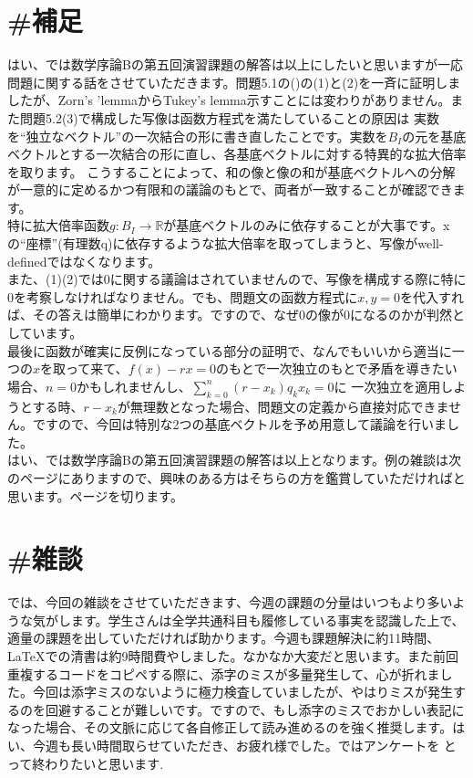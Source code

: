 \documentclass{jreport}
\begin{document}
\section{\#補足}
はい、では数学序論Bの第五回演習課題の解答は以上にしたいと思いますが一応問題に関する話をさせていただきます。問題5.1の()の(1)と(2)を一斉に証明しましたが、Zorn's 'lemmaからTukey's lemma示すことには変わりがありません。また問題5.2(3)で構成した写像は函数方程式を満たしていることの原因は
実数を“独立なベクトル”の一次結合の形に書き直したことです。実数を$B_I$の元を基底ベクトルとする一次結合の形に直し、各基底ベクトルに対する特異的な拡大倍率を取ります。
こうすることによって、和の像と像の和が基底ベクトルへの分解が一意的に定めるかつ有限和の議論のもとで、両者が一致することが確認できます。\\
特に拡大倍率函数$g: B_I \to \mathbb{R}$が基底ベクトルのみに依存することが大事です。xの“座標”(有理数q)に依存するような拡大倍率を取ってしまうと、写像がwell-definedではなくなります。\\
また、(1)(2)では0に関する議論はされていませんので、写像を構成する際に特に0を考察しなければなりません。でも、問題文の函数方程式に$x,y=0$を代入すれば、その答えは簡単にわかります。ですので、なぜ0の像が0になるのかが判然としています。\\
最後に函数が確実に反例になっている部分の証明で、なんでもいいから適当に一つの$x$を取って来て、$f(x)-rx=0$のもとで一次独立のもとで矛盾を導きたい場合、$n=0$かもしれませんし、$\sum\limits_{k=0}^{n}(r-x_k)q_kx_k=0$に
一次独立を適用しようとする時、$r-x_k$が無理数となった場合、問題文の定義から直接対応できません。ですので、今回は特別な2つの基底ベクトルを予め用意して議論を行いました。\\
はい、では数学序論Bの第五回演習課題の解答は以上となります。例の雑談は次のページにありますので、興味のある方はそちらの方を鑑賞していただければと思います。ページを切ります。
\newpage
\section{\#雑談}
では、今回の雑談をさせていただきます、今週の課題の分量はいつもより多いような気がします。学生さんは全学共通科目も履修している事実を認識した上で、適量の課題を出していただければ助かります。今週も課題解決に約11時間、\LaTeX での清書は約9時間費やしました。なかなか大変だと思います。また前回重複するコードをコピペする際に、添字のミスが多量発生して、心が折れました。今回は添字ミスのないように極力検査していましたが、やはりミスが発生するのを回避することが難しいです。ですので、もし添字のミスでおかしい表記になった場合、その文脈に応じて各自修正して読み進めるのを強く推奨します。はい、今週も長い時間取らせていただき、お疲れ様でした。ではアンケートを
とって終わりたいと思います.\\
\end{document}
